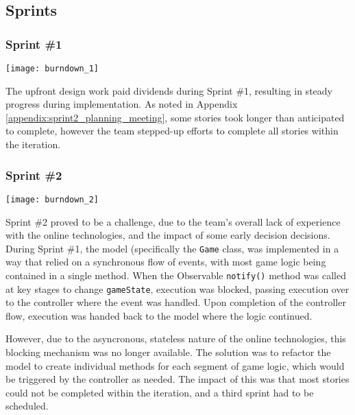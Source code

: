 \subsection{Sprints}

\subsubsection{Sprint \#1}

\begin{center}
	\texttt{[image: burndown\_1]}
	\label{figure:burndown_1}
\end{center}

The upfront design work paid dividends during Sprint \#1, resulting in steady progress during implementation.
As noted in Appendix \ref{appendix:sprint2_planning_meeting}, some stories took longer than anticipated to complete, however the team stepped-up efforts to complete all stories within the iteration.

\subsubsection{Sprint \#2}

\begin{center}
	\texttt{[image: burndown\_2]}
	\label{figure:burndown_2}
\end{center}

Sprint \#2 proved to be a challenge, due to the team's overall lack of experience with the online technologies, and the impact of some early decision decisions.
During Sprint \#1, the model (specifically the \texttt{Game} class, was implemented in a way that relied on a synchronous flow of events, with most game logic being contained in a single method. When the Observable \texttt{notify()} method was called at key stages to change \texttt{gameState}, execution was blocked, passing execution over to the controller where the event was handled. Upon completion of the controller flow, execution was handed back to the model where the logic continued.

However, due to the asyncronous, stateless nature of the online technologies, this blocking mechanism was no longer available.
The solution was to refactor the model to create individual methods for each segment of game logic, which would be triggered by the controller as needed.
The impact of this was that most stories could not be completed within the iteration, and a third sprint had to be scheduled.

